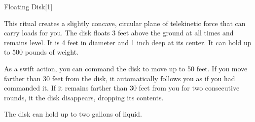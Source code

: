 \begin{spellsection}{Floating Disk}[1]
    \begin{spellheader}
    \end{spellheader}
    \begin{spellcontent}
        \begin{spelltargetinginfo}
            \spellrng{\rngmed}
        \end{spelltargetinginfo}
        \begin{spelleffects}
            \spelleffect This ritual creates a slightly concave, circular plane of telekinetic force that can carry loads for you. The disk floats 3 feet above the ground at all times and remains level. It is 4 feet in diameter and 1 inch deep at its center. It can hold up to 500 pounds of weight.

            As a swift action, you can command the disk to move up to 50 feet. If you move farther than 30 feet from the disk, it automatically follows you as if you had commanded it. If it remains farther than 30 feet from you for two consecutive rounds, it the disk disappears, dropping its contents.
            \spelldur \durext \dismissable
        \end{spelleffects}
    \end{spellcontent}
    \begin{spellfooter}
        \spellnotes The disk can hold up to two gallons of liquid.
    \end{spellfooter}
    \begin{spellaugments}
    \end{spellaugments}
\end{spellsection}

